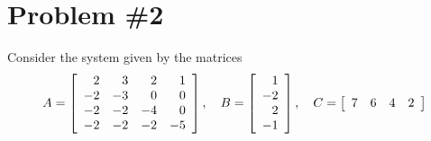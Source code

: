 \documentclass{article}
\begin{document}
\pagebreak

\section*{Problem \#2}
Consider the system given by the matrices
$$
A
= \left[\begin{array}{r r r r}
     2 &  3 &  2 &  1 \\
    -2 & -3 &  0 &  0 \\
    -2 & -2 & -4 &  0 \\
    -2 & -2 & -2 & -5
  \end{array}\right], \quad
B
= \left[\begin{array}{r}
    1 \\ -2 \\ 2 \\ -1
  \end{array}\right], \quad
C
= \left[\begin{array}{c c c c}
    7 & 6 & 4 & 2
  \end{array}\right]
$$
\end{document}
